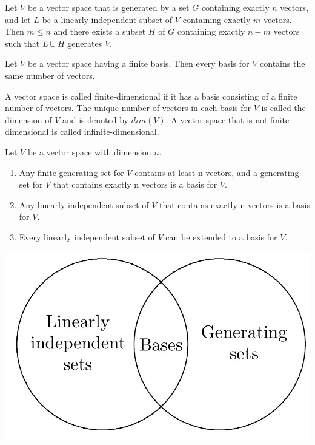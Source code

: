 \begin{thm} %
	Let $V$ be a vector space that is generated by a set $G$ containing exactly $n$ vectors, and let $L$ be a linearly independent subset of $V$ containing exactly $m$ vectors. Then $m \leq n$ and there exists a subset $H$ of $G$ containing exactly $n - m$ vectors such that $L \cup H$ generates $V$.
\end{thm}
\pfshow{}


\begin{cor} %
	Let $V$ be a vector space having a finite basis. Then every basis for $V$ contains the same number of vectors.	
\end{cor}
\pfshow{}

\begin{defn}
	A vector space is called finite-dimensional if it has a basis consisting of a finite number of vectors. The unique number of vectors
 in each basis for $V$ is called the dimension of $V$ and is denoted by $dim(V)$.
A vector space that is not finite-dimensional is called infinite-dimensional.
\end{defn}

\begin{cor}%
	Let $V$ be a vector space with dimension $n$.
	\begin{enumerate}
		\item Any finite generating set for $V$ contains at least n vectors, and a generating set for $V$ that contains exactly n vectors is a basis for $V$.
		\item Any linearly independent subset of $V$ that contains exactly n vectors is a basis for $V$.
		\item Every linearly independent subset of $V$ can be extended to a basis for $V$.
	\end{enumerate}
\end{cor}
\pfshow{}

\begin{center}
		\includegraphics[scale = 0.25]{./figure/49.jpg}
\end{center}


